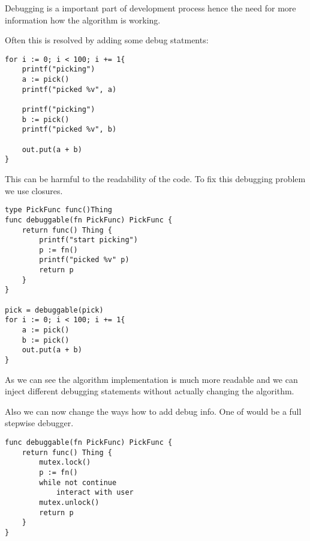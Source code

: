 Debugging is a important part of development process hence the need for 
more information how the algorithm is working.

Often this is resolved by adding some debug statments:

\begin{verbatim}
for i := 0; i < 100; i += 1{
    printf("picking")
    a := pick()
    printf("picked %v", a)

    printf("picking")
    b := pick()
    printf("picked %v", b)
    
    out.put(a + b)
}
\end{verbatim}

This can be harmful to the readability of the code. To fix this debugging problem we use closures.

\begin{verbatim}
type PickFunc func()Thing
func debuggable(fn PickFunc) PickFunc {
    return func() Thing {
        printf("start picking")
        p := fn()
        printf("picked %v" p)
        return p
    }
}

pick = debuggable(pick)
for i := 0; i < 100; i += 1{
    a := pick()
    b := pick()
    out.put(a + b)
}
\end{verbatim}

As we can see the algorithm implementation is much more readable and 
we can inject different debugging statements without actually changing the algorithm.

Also we can now change the ways how to add debug info. One of would 
be a full stepwise debugger.

\begin{verbatim}
func debuggable(fn PickFunc) PickFunc {
    return func() Thing {
        mutex.lock()
        p := fn()
        while not continue
            interact with user
        mutex.unlock()
        return p
    }
}
\end{verbatim}